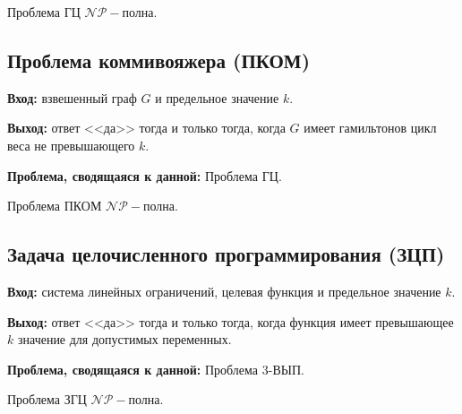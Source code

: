 \begin{corollary}
    Проблема ГЦ $\mathscr{NP-}$полна.
\end{corollary}

\subsection*{Проблема коммивояжера (ПКОМ)}
\textbf{Вход:} взвешенный граф $G$ и предельное значение $k$.

\textbf{Выход:} ответ <<да>> тогда и только тогда, когда $G$ имеет гамильтонов цикл веса не превышающего $k$.

\textbf{Проблема, сводящаяся к данной:} Проблема ГЦ.

\begin{corollary}
    Проблема ПКОМ $\mathscr{NP-}$полна.
\end{corollary}

\subsection*{Задача целочисленного программирования (ЗЦП)}
\textbf{Вход:} система линейных ограничений, целевая функция и предельное значение $k$.

\textbf{Выход:} ответ <<да>> тогда и только тогда, когда функция имеет превышающее $k$ значение для допустимых переменных.

\textbf{Проблема, сводящаяся к данной:} Проблема 3-ВЫП.

\begin{corollary}
    Проблема ЗГЦ $\mathscr{NP-}$полна.
\end{corollary}